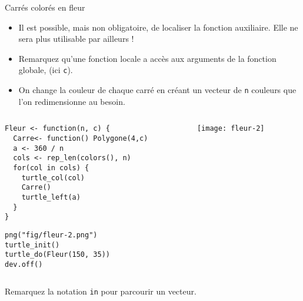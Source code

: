 \documentclass[10pt]{beamer}
\begin{document}
\begin{frame}[fragile]{Carrés colorés en fleur}

  \begin{itemize}
  \item Il est possible, mais non obligatoire, de \alert{localiser la fonction auxiliaire}. Elle ne sera plus utilisable par ailleurs !
  \item Remarquez qu'une fonction locale a accès aux arguments de la fonction globale, (ici \texttt{c}).
  \item On change la couleur de chaque carré en créant un vecteur de \texttt{n} couleurs que l'on redimensionne au besoin.

  \end{itemize}
\begin{columns}[c]
\begin{column}{0.58\textwidth}
  \begin{lstlisting}[style=editor]
Fleur <- function(n, c) {
  Carre<- function() Polygone(4,c)
  a <- 360 / n
  cols <- rep_len(colors(), n)
  for(col in cols) {
    turtle_col(col)
    Carre()
    turtle_left(a)
  }
}
\end{lstlisting}

\begin{lstlisting}[linerange=2-3]
png("fig/fleur-2.png")
turtle_init()
turtle_do(Fleur(150, 35))
dev.off()
\end{lstlisting}
\end{column}

\begin{column}{0.38\textwidth}
    \texttt{[image: fleur-2]}
\end{column}
\end{columns}

Remarquez la notation \lstinline!in! pour parcourir un vecteur.
\end{frame}
\end{document}
